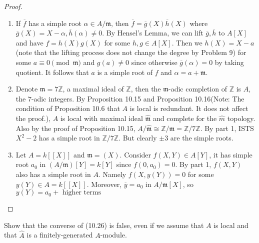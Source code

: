\documentclass{solution}
\begin{document}
\begin{proof}
    \begin{enumerate}
        \item If $\overline{f}$ has a simple root $\alpha \in A / \mathfrak{m}$, then $\overline{f} = \overline{g}(X)\overline{h}(X)$ where $\overline{g}(X) = X - \alpha, \overline{h}(\alpha) \ne 0$. By Hensel's Lemma, we can lift $\overline{g}, \overline{h}$ to $A[X]$ and have $f = h(X) g(X)$ for some $h, g \in A[X]$. Then we $h(X) = X - a$ (note that the lifting process does not change the degree by Problem 9) for some $a \equiv 0 \pmod {\mathfrak{m}}$ and $g(a) \ne 0$ since otherwise $\overline{g}(\alpha) = 0$ by taking quotient. It follows that $a$ is a simple root of $f$ and $\alpha = a + \mathfrak{m}$.
        \item Denote $\mathfrak{m} = 7 \mathbb{Z}$, a maximal ideal of $\mathbb{Z}$, then the $\mathfrak{m}$-adic completion of $\mathbb{Z}$ is $A$, the $7$-adic integers. By Proposition 10.15 and Proposition 10.16(Note: The condition of Proposition 10.6 that $A$ is local is redundant. It does not affect the proof.), $A$ is local with maximal ideal $\hat{\mathfrak{m}}$ and complete for the $\hat{m}$ topology. Also by the proof of Proposition 10.15, $A / \hat{\mathfrak{m}} \cong \mathbb{Z} / \mathfrak{m} = \mathbb{Z} / 7 \mathbb{Z}$. By part 1, ISTS $X^2 - 2$ has a simple root in $\mathbb{Z} / 7 \mathbb{Z}$. But clearly $\pm 3$ are the simple roots.
        \item Let $A = k[[X]]$ and $\mathfrak{m} = (X)$. Consider $f(X, Y) \in A[Y]$, it has simple root $a_0$ in $(A / \mathfrak{m})[Y] = k[Y]$ since $f(0, a_0) = 0$. By part 1, $f(X, Y)$ also has a simple root in $A$. Namely $f(X, y(Y)) = 0$ for some $y(Y) \in A = k[[X]]$. Moreover, $\overline{y} = a_0$ in $A / \mathfrak{m}[X]$, so $y(Y) = a_0 + \text{ higher terms}$
    \end{enumerate}
\end{proof}

\begin{problem}
    Show that the converse of (10.26) is false, even if we assume that $A$ is local and that $\hat{A}$ is a finitely-generated $A$-module.
\end{problem}
\end{document}
